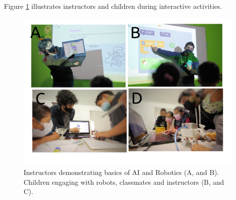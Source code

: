 \documentclass[conference]{IEEEtran}
\begin{document}
Figure \ref{fig:pilot} illustrates instructors and children during interactive activities. 
\begin{figure}[htbp]
    \centerline{\includegraphics[width=\linewidth]{piloting-workshops/versions/drawing-v00.png}}
    \caption{
        Instructors demonstrating basics of AI and Robotics (A, and B). 
        Children engaging with robots, classmates and instructors (B, and C).
        }
    \label{fig:pilot}
\end{figure}


    


\end{document}

